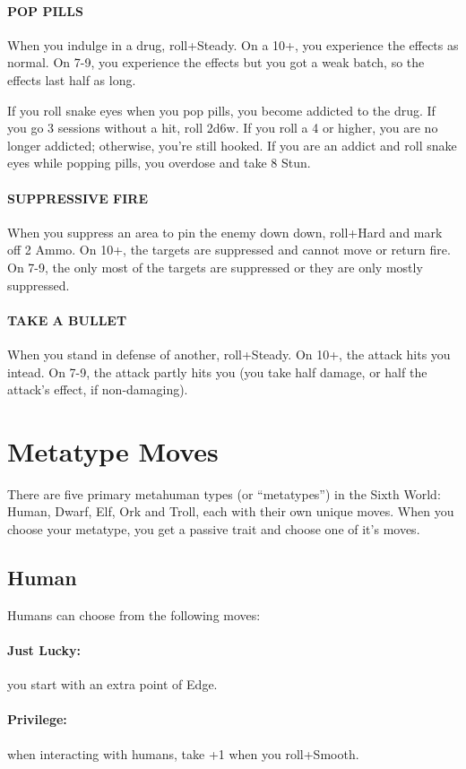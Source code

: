 \paragraph{POP PILLS}
When you indulge in a drug, roll+Steady. On a 10+, you experience the effects as normal. On 7-9, you experience the effects but you got a weak batch, so the effects last half as long.

If you roll snake eyes when you pop pills, you become addicted to the drug. If you go 3 sessions without a hit, roll 2d6w. If you roll a 4 or higher, you are no longer addicted; otherwise, you’re still hooked. If you are an addict and roll snake eyes while popping pills, you overdose and take 8 Stun.


\paragraph{SUPPRESSIVE FIRE}
When you suppress an area to pin the enemy down down, roll+Hard and mark off 2 Ammo. On 10+, the targets are suppressed and cannot move or return fire. On 7-9, the only most of the targets are suppressed or they are only mostly suppressed.

\paragraph{TAKE A BULLET}
When you stand in defense of another, roll+Steady. On 10+, the attack hits you intead. On 7-9, the attack partly hits you (you take half damage, or half the attack’s effect, if non-damaging).



\section{Metatype Moves}
There are five primary metahuman types (or ``metatypes'') in the Sixth World: Human, Dwarf, Elf, Ork and Troll, each with their own unique moves. When you choose your metatype, you get a passive trait and choose one of it's moves.

\subsection{Human}
Humans can choose from the following moves:
\paragraph{Just Lucky:} you start with an extra point of Edge.
\paragraph{Privilege:} when interacting with humans, take +1 when you roll+Smooth.

